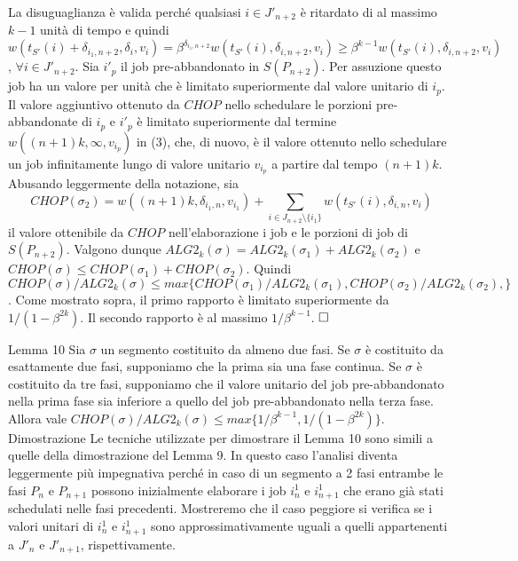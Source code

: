 \documentclass[12pt]{article}
\begin{document}
La disuguaglianza è valida perché qualsiasi $i \in J'_{n+2}$ è ritardato di al massimo $k - 1$
unità di tempo e quindi $w(t_{S'}(i) + \delta_{i_{1}, n + 2}, \delta_{i}, v_{i}) = \beta^{\delta_{i_{1}, n + 2}} w (t_{S'}(i), \delta_{i, n + 2}, v_{i}) \geq \beta^{k - 1}w (t_{S'}(i) , \delta_{i, n + 2}, v_{i})$, $\forall i \in J'_{n+2}$.
Sia $i'_{p}$ il job pre-abbandonato in $S(P_{n+2})$. Per assuzione questo job ha un valore per unità che è limitato superiormente dal valore unitario di $i_{p}$. Il valore aggiuntivo ottenuto da $CHOP$ nello schedulare le porzioni pre-abbandonate di $i_{p}$ e $i'_{p}$ è limitato superiormente dal termine $w ((n + 1) k, \infty, v_{i_{p}})$ in (3), che, di nuovo, è il valore ottenuto nello schedulare un job infinitamente lungo di valore unitario $v_{i_{p}}$ a partire dal tempo $(n + 1) k$. Abusando leggermente della notazione, sia
$$CHOP(\sigma_{2}) = w ((n + 1) k, \delta_{i_{1}, n}, v_{i_{1}}) + \sum_{i \in J_{n+2} \setminus \{i_{1}\}} w (t_{S'}(i), \delta_{i, n}, v_{i})$$ 
il valore ottenibile da $CHOP$ nell'elaborazione i job e le porzioni di job di $S(P_{n+2})$. Valgono dunque $ALG2_{k} (\sigma) = ALG2_{k} (\sigma_{1}) + ALG2_{k} (\sigma_{2})$ e $CHOP(\sigma) \leq CHOP (\sigma_{1}) + CHOP (\sigma_{2})$. Quindi $CHOP (\sigma) / ALG2_{k} (\sigma) \leq max \{CHOP(\sigma_{1}) / ALG2_{k}(\sigma_{1}), CHOP(\sigma_{2}) / ALG2_{k}(\sigma_{2}),\}$. Come mostrato sopra, il primo rapporto è limitato superiormente da $1 / (1 - \beta^{2k})$. Il secondo rapporto è al massimo $1 / \beta^{k - 1}$. $\hfill \square$

Lemma 10 Sia $\sigma$ un segmento costituito da almeno due fasi. Se $\sigma$ è costituito da esattamente due fasi, supponiamo che la prima sia una fase continua. Se $\sigma$ è costituito da tre fasi, supponiamo che il valore unitario del job pre-abbandonato nella prima fase sia inferiore a quello del job pre-abbandonato nella terza fase. Allora vale $CHOP(\sigma) / ALG2_{k}(\sigma) \leq max \{1 / \beta^{k-1}, 1 / (1 - \beta^{2k})\}.$
Dimostrazione
Le tecniche utilizzate per dimostrare il Lemma 10 sono simili a quelle della dimostrazione del Lemma 9. In questo caso l'analisi diventa leggermente più impegnativa perché in caso di un segmento a 2 fasi entrambe le fasi $P_{n}$ e $P_{n + 1}$ possono inizialmente elaborare i job $i_{n}^{1}$ e $i_{n+1}^{1}$ che erano già stati schedulati nelle fasi precedenti. Mostreremo che il caso peggiore si verifica se i valori unitari di $i_{n}^{1}$ e $i_{n+1}^{1}$ sono approssimativamente uguali a quelli appartenenti a $J'_{n}$ e $J'_{n+1}$, rispettivamente. 
\end{document}
